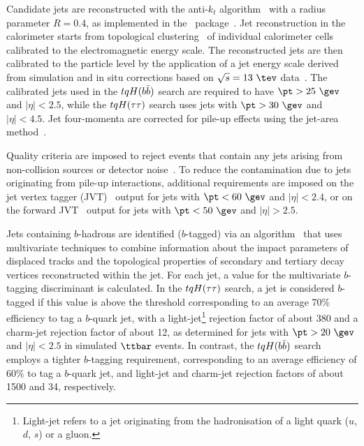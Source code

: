 Candidate jets are reconstructed with the anti-$k_t$ algorithm~\cite{Cacciari:2008gp,Cacciari:2005hq} with a
radius parameter $R=0.4$, as implemented in the \fastjet\ package~\cite{Cacciari:2011ma}.  
Jet reconstruction in the calorimeter starts from topological clustering~\cite{Aad:2016upy} of individual calorimeter cells calibrated to the electromagnetic energy scale. 
The reconstructed jets are then calibrated to the particle level by the application of a jet energy scale 
derived from simulation and in situ corrections based on $\sqrt{s}=13~\tev$ data~\cite{Aaboud:2017jcu}.
The calibrated jets used in the $tqH(b\bar{b})$ search are required to have $\pt > 25~\gev$ and $|\eta| < 2.5$,
while the $tqH(\tau\tau)$ search uses jets with $\pt > 30~\gev$ and $|\eta| < 4.5$.
Jet four-momenta are corrected for pile-up effects using the jet-area method~\cite{Cacciari:2008gn}.

Quality criteria are imposed to reject events that contain any jets arising from non-collision sources
or detector noise~\cite{ATLAS-CONF-2015-029}.  To reduce the contamination due to jets originating from pile-up interactions,
additional requirements are imposed on the jet vertex tagger (JVT)~\cite{Aad:2015ina} output for jets with $\pt<60~\gev$ and $|\eta| < 2.4$,
or on the forward JVT~\cite{Aaboud:2017pou} output for jets with $\pt<50~\gev$ and $|\eta| > 2.5$.

Jets containing $b$-hadrons are identified ($b$-tagged) via an algorithm~\cite{Aad:2015ydr,ATL-PHYS-PUB-2016-012} 
that uses multivariate techniques to combine information about the impact parameters of displaced tracks and the  topological properties 
of secondary and tertiary decay vertices reconstructed within the jet. For each jet, a value for the multivariate $b$-tagging discriminant is 
calculated. In the $tqH(\tau\tau)$ search, a jet is considered $b$-tagged if this value is above the threshold corresponding to
an average 70\% efficiency to tag a $b$-quark jet, with a light-jet\footnote{Light-jet refers to a jet originating from the hadronisation of a light quark 
($u$, $d$, $s$) or a gluon.} rejection factor of about 380 and a charm-jet rejection factor of about 12, as determined for jets with
$\pt >20~\gev$ and $|\eta|<2.5$ in simulated $\ttbar$ events. In contrast, the $tqH(b\bar{b})$ search employs a tighter $b$-tagging requirement, 
corresponding to an average efficiency of 60\% to tag a $b$-quark jet, and light-jet and charm-jet rejection factors of about 1500 and 34, respectively.

